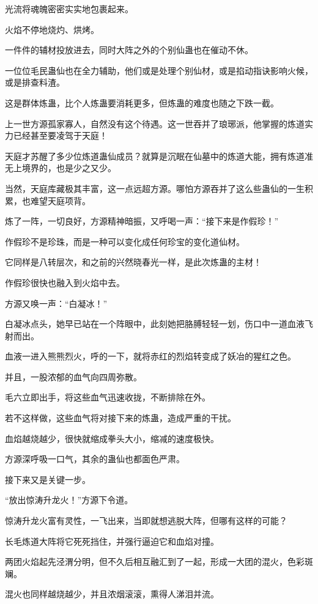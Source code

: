 \begin{this_body}
光流将魂魄密密实实地包裹起来。

火焰不停地烧灼、烘烤。

一件件的辅材投放进去，同时大阵之外的个别仙蛊也在催动不休。

一位位毛民蛊仙也在全力辅助，他们或是处理个别仙材，或是掐动指诀影响火候，或是排查料渣。

这是群体炼蛊，比个人炼蛊要消耗更多，但炼蛊的难度也随之下跌一截。

上一世方源孤家寡人，自然没有这个待遇。这一世吞并了琅琊派，他掌握的炼道实力已经甚至要凌驾于天庭！

天庭才苏醒了多少位炼道蛊仙成员？就算是沉眠在仙墓中的炼道大能，拥有炼道准无上境界的，也是少之又少。

当然，天庭库藏极其丰富，这一点远超方源。哪怕方源吞并了这么些蛊仙的一生积累，也难望天庭项背。

炼了一阵，一切良好，方源精神暗振，又呼喝一声：“接下来是作假珍！”

作假珍不是珍珠，而是一种可以变化成任何珍宝的变化道仙材。

它同样是八转层次，和之前的兴然晓春光一样，是此次炼蛊的主材！

作假珍很快也融入到火焰中去。

方源又唤一声：“白凝冰！”

白凝冰点头，她早已站在一个阵眼中，此刻她把胳膊轻轻一划，伤口中一道血液飞射而出。

血液一进入熊熊烈火，呼的一下，就将赤红的烈焰转变成了妖冶的猩红之色。

并且，一股浓郁的血气向四周弥散。

毛六立即出手，将这些血气迅速收拢，不断排除在外。

若不这样做，这些血气将对接下来的炼蛊，造成严重的干扰。

血焰越烧越少，很快就缩成拳头大小，缩减的速度极快。

方源深呼吸一口气，其余的蛊仙也都面色严肃。

接下来又是关键一步。

“放出惊涛升龙火！”方源下令道。

惊涛升龙火富有灵性，一飞出来，当即就想逃脱大阵，但哪有这样的可能？

长毛炼道大阵将它死死挡住，并强行逼迫它和血焰对撞。

两团火焰起先泾渭分明，但不久后相互融汇到了一起，形成一大团的混火，色彩斑斓。

混火也同样越烧越少，并且浓烟滚滚，熏得人涕泪并流。


\end{this_body}
